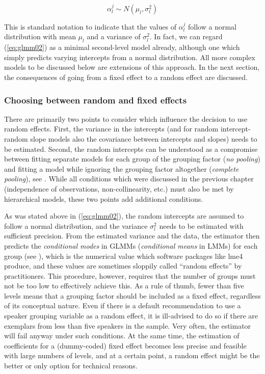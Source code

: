 \documentclass[a4paper,12pt]{article}
\begin{document}
\begin{equation}
  \alpha_l^j\sim N(\mu_l,\sigma_l^2)
  \label{eq:glmm02}
\end{equation}

This is standard notation to indicate that the values of $\alpha_l^j$ follow a normal distribution with mean $\mu_l$ and a variance of $\sigma_l^2$.
In fact, we can regard (\ref{eq:glmm02}) as a minimal second-level model already, although one which simply predicts varying intercepts from a normal distribution.
All more complex models to be discussed below are extensions of this approach.
In the next section, the consequences of going from a fixed effect to a random effect are discussed.

\subsubsection{Choosing between random and fixed effects}
\label{sec:choosingbetweenrandomandfixedeffects}

There are primarily two points to consider which influence the decision to use random effects.
First, the variance in the intercepts (and for random intercept-random slope models also the covariance between intercepts and slopes) needs to be estimated.
Second, the random intercepts can be understood as a compromise between fitting separate models for each group of the grouping factor (\textit{no pooling}) and fitting a model while ignoring the grouping factor altogether (\textit{complete pooling}), see \citet[Ch.~12]{GelmanHill2006}.
While all conditions which were discussed in the previous chapter (independence of observations, non-collinearity, etc.) must also be met by hierarchical models, these two points add additional conditions.

As was stated above in (\ref{eq:glmm02}), the random intercepts are assumed to follow a normal distribution, and the variance $\sigma_l^2$ needs to be estimated with sufficient precision.
From the estimated variance and the data, the estimator then predicts the \textit{conditional modes} in GLMMs (\textit{conditional means} in LMMs) for each group (see \citealt[Ch.~1]{Bates2010}), which is the numerical value which software packages like lme4 produce, and these values are sometimes sloppily called ``random effects'' by practitioners.
This procedure, however, requires that the number of groups must not be too low to effectively achieve this.
As a rule of thumb, fewer than five levels means that a grouping factor should be included as a fixed effect, regardless of its conceptual nature.
Even if there is a default recommendation to use a speaker grouping variable as a random effect, it is ill-advised to do so if there are exemplars from less than five speakers in the sample.
Very often, the estimator will fail anyway under such conditions.
At the same time, the estimation of coefficients for a (dummy-coded) fixed effect becomes less precise and feasible with large numbers of levels, and at a certain point, a random effect might be the better or only option for technical reasons.
\end{document}
